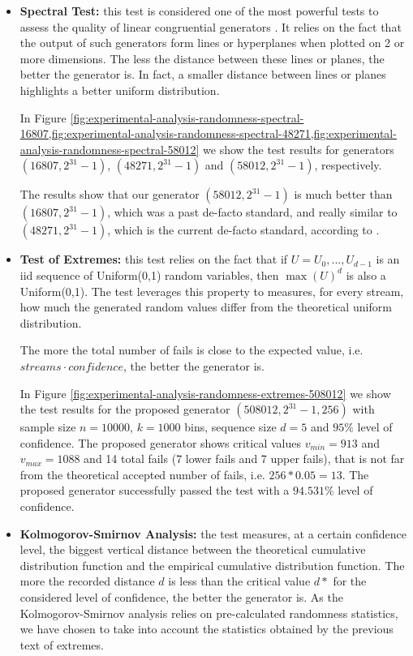 \begin{itemize}
	\item \textbf{Spectral Test:} this test is considered one of the most powerful tests to assess the quality of linear congruential generators \cite{knuth1981art}. It relies on the fact that the output of such generators form lines or hyperplanes when plotted on 2 or more dimensions. The less the distance between these lines or planes, the better the generator is. In fact, a smaller distance between lines or planes highlights a better uniform distribution.
	
	In Figure \ref{fig:experimental-analysis-randomness-spectral-16807,fig:experimental-analysis-randomness-spectral-48271,fig:experimental-analysis-randomness-spectral-58012} we show the test results for generators $(16807,2^{31}-1)$, $(48271,2^{31}-1)$ and $(58012,2^{31}-1)$, respectively.
	
	The results show that our generator $(58012,2^{31}-1)$ is much better than $(16807, 2^{31}-1)$, which was a past de-facto standard, and really similar to $(48271,2^{31}-1)$, which is the current de-facto standard, according to \cite{leemis2006discrete}.
	
	\item \textbf{Test of Extremes:} this test relies on the fact that if $U=U_{0},...,U_{d-1}$ is an iid sequence of Uniform(0,1) random variables, then $\max(U)^{d}$ is also a Uniform(0,1). The test leverages this property to measures, for every stream, how much the generated random values differ from the theoretical uniform distribution.
	
	The more the total number of fails is close to the expected value, i.e. $streams \cdot confidence$, the better the generator is.
	
	In Figure \ref{fig:experimental-analysis-randomness-extremes-508012} we show the test results for the proposed generator $(508012,2^{31}-1, 256)$ with sample size $n=10000$, $k=1000$ bins, sequence size $d=5$ and $95\%$ level of confidence.
	The proposed generator shows critical values $v_{min}=913$ and $v_{max}=1088$ and 14 total fails (7 lower fails and 7 upper fails), that is not far from the theoretical accepted number of fails, i.e. $256*0.05=13$.
	The proposed generator successfully passed the test with a $94.531\%$ level of confidence.
	
	\item \textbf{Kolmogorov-Smirnov Analysis:} the test measures, at a certain confidence level, the biggest vertical distance between the theoretical cumulative distribution function and the empirical cumulative distribution function.
	The more the recorded distance $d$ is less than the critical value $d*$ for the considered level of confidence, the better the generator is.
	As the Kolmogorov-Smirnov analysis relies on pre-calculated randomness statistics, we have chosen to take into account the statistics obtained by the previous text of extremes.
	

\end{itemize}
